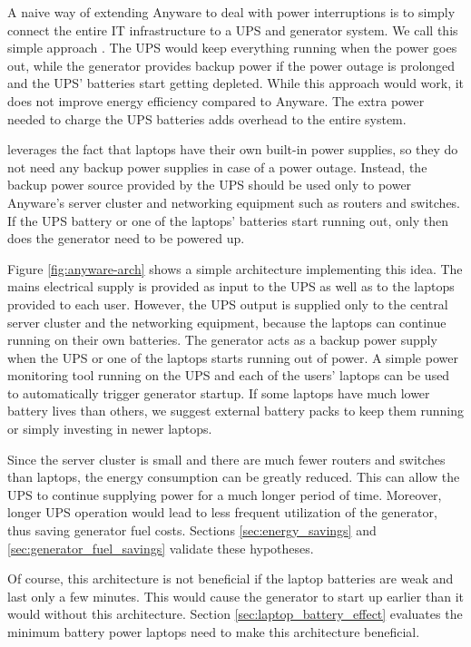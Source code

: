 A naive way of extending Anyware to deal with power interruptions is to simply
connect the entire IT infrastructure to a UPS and generator system. We call this
simple approach \anywareups{}. The UPS 
would keep everything running when the power goes out, while the generator 
provides backup power if the power outage is prolonged and the UPS' batteries
start getting depleted. While this approach would work, it does not improve
energy efficiency compared to Anyware. The extra power needed to charge the UPS
batteries adds overhead to the entire system.

\anywaredc{} leverages the fact that laptops have their own built-in power 
supplies, so they do not need any backup power supplies in case of a power outage.
Instead, the backup power source provided by the UPS should be used only 
to power Anyware's server cluster and networking equipment such as routers and 
switches. If the UPS battery or one of the laptops' batteries start running out, 
only then does the generator need to be powered up.

Figure \ref{fig:anyware-arch} shows a simple architecture implementing this idea. The mains 
electrical supply is provided as input to the UPS as well as to the laptops 
provided to each user. However, the UPS output is supplied only to the central 
server cluster and the networking equipment, because the laptops can continue 
running on their own batteries. The generator acts as a backup power supply when 
the UPS or one of the laptops starts running out of power. A simple power 
monitoring tool running on the UPS and each of the users' laptops can be used to 
automatically trigger generator startup. If some laptops have much
lower battery lives than others, we suggest external battery packs to keep them
running or simply investing in newer laptops.

Since the server cluster is small and there are much fewer routers and switches
than laptops, the energy consumption can be greatly reduced. 
This can allow the UPS to continue supplying power for a much longer period of time. 
Moreover, longer UPS operation would lead to less frequent utilization of the 
generator, thus saving generator fuel costs. Sections
\ref{sec:energy_savings} and \ref{sec:generator_fuel_savings} validate these hypotheses. 

Of course, this architecture is not beneficial if the laptop batteries are weak and last only a few 
minutes. This would cause the generator to start up earlier than it would 
without this architecture. Section \ref{sec:laptop_battery_effect} evaluates the
minimum battery power laptops need to make this architecture beneficial.

